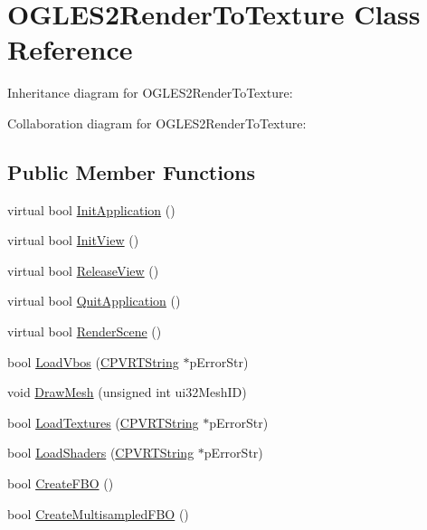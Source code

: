 \hypertarget{class_o_g_l_e_s2_render_to_texture}{\section{O\+G\+L\+E\+S2\+Render\+To\+Texture Class Reference}
\label{class_o_g_l_e_s2_render_to_texture}
}


Inheritance diagram for O\+G\+L\+E\+S2\+Render\+To\+Texture\+:


Collaboration diagram for O\+G\+L\+E\+S2\+Render\+To\+Texture\+:
\subsection*{Public Member Functions}
\begin{DoxyCompactItemize}
\item 
virtual bool \hyperlink{class_o_g_l_e_s2_render_to_texture_ad79f5609f8736b68e20c53383a5d913b}{Init\+Application} ()
\item 
virtual bool \hyperlink{class_o_g_l_e_s2_render_to_texture_aa1172d6c2955b94c41979ccaa0000fbc}{Init\+View} ()
\item 
virtual bool \hyperlink{class_o_g_l_e_s2_render_to_texture_ade27271fabd9ffb70a3f4b8f9ac5769e}{Release\+View} ()
\item 
virtual bool \hyperlink{class_o_g_l_e_s2_render_to_texture_abdae39093b663509e836f48569eabb27}{Quit\+Application} ()
\item 
virtual bool \hyperlink{class_o_g_l_e_s2_render_to_texture_a62cd9e0f34be9eec8f8a7ad459e71582}{Render\+Scene} ()
\item 
bool \hyperlink{class_o_g_l_e_s2_render_to_texture_ada88c6635a52b7452b3006c83a7f0d46}{Load\+Vbos} (\hyperlink{class_c_p_v_r_t_string}{C\+P\+V\+R\+T\+String} $\ast$p\+Error\+Str)
\item 
void \hyperlink{class_o_g_l_e_s2_render_to_texture_a1f598981abe26dfbc6ebee5b39cf246a}{Draw\+Mesh} (unsigned int ui32\+Mesh\+I\+D)
\item 
bool \hyperlink{class_o_g_l_e_s2_render_to_texture_ad1ad135ea99af5576c9243cb49b4f34c}{Load\+Textures} (\hyperlink{class_c_p_v_r_t_string}{C\+P\+V\+R\+T\+String} $\ast$p\+Error\+Str)
\item 
bool \hyperlink{class_o_g_l_e_s2_render_to_texture_a8e57060779052f298a8b4329b17cad88}{Load\+Shaders} (\hyperlink{class_c_p_v_r_t_string}{C\+P\+V\+R\+T\+String} $\ast$p\+Error\+Str)
\item 
bool \hyperlink{class_o_g_l_e_s2_render_to_texture_a1431dd2959a5c8454a422c173adf8fde}{Create\+F\+B\+O} ()
\item 
bool \hyperlink{class_o_g_l_e_s2_render_to_texture_a9cabc2745b93bd5d9b76d6e0be6f7eb7}{Create\+Multisampled\+F\+B\+O} ()
\end{DoxyCompactItemize}


